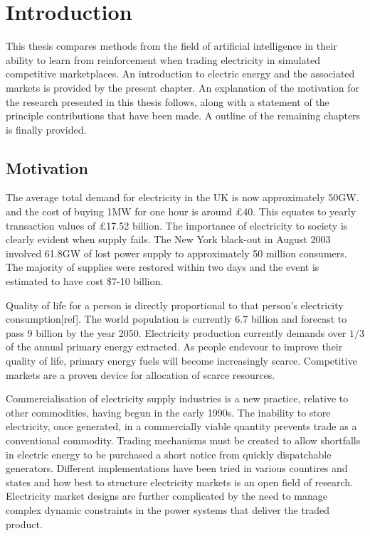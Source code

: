 \chapter{Introduction}
This thesis compares methods from the field of artificial intelligence in their
ability to learn from reinforcement when trading electricity in simulated
competitive marketplaces.  An introduction to electric energy and the
associated markets is provided by the present chapter.  An explanation of the
motivation for the research presented in this thesis follows, along with a
statement of the principle contributions that have been made.  A outline of the
remaining chapters is finally provided.

\section{Motivation}
The average total demand for electricity in the UK is now approximately 50GW.
and the cost of buying 1MW for one hour is around \pounds40.  This equates to
yearly transaction values of \pounds17.52 billion.  The importance of electricity to
society is clearly evident when supply fails.  The New York black-out in August
2003 involved 61.8GW of lost power supply to approximately 50 million
consumers.  The majority of supplies were restored within two days and the
event is estimated to have cost \$7-10 billion.

Quality of life for a person is directly proportional to that person's
electricity consumption[ref].  The world population is currently 6.7 billion
and forecast to pass 9 billion by the year 2050.  Electricity production
currently demands over $1/3$ of the annual primary energy extracted.  As people
endevour to improve their quality of life, primary energy fuels will become
increasingly scarce.  Competitive markets are a proven device for allocation
of scarce resources.

Commercialisation of electricity supply industries is a new practice, relative
to other commodities, having begun in the early 1990s.  The inability to store
electricity, once generated, in a commercially viable quantity prevents trade
as a conventional commodity.  Trading mechanisms must be created to allow
shortfalls in electric energy to be purchased a short notice from quickly
dispatchable generators.  Different implementations have been tried in various
countires and states and how best to structure electricity markets is an open
field of research.  Electricity market designs are further complicated by the
need to manage complex dynamic constraints in the power systems that deliver
the traded product.

